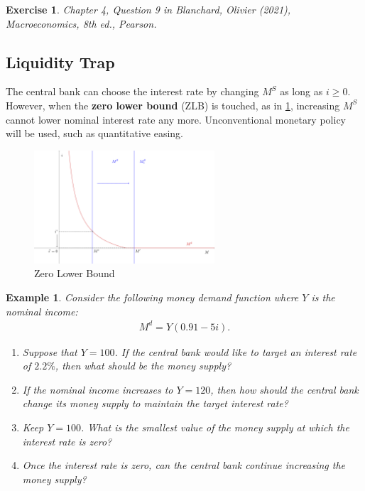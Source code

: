 \documentclass[12pt]{article}
\newtheorem{example}{Example}
\newtheorem{exercise}{Exercise}
\begin{document}
\begin{exercise}
	Chapter 4, Question 9 in Blanchard, Olivier (2021), \textit{Macroeconomics}, 8th ed., Pearson.
\end{exercise}

\subsection*{Liquidity Trap}
The central bank can choose the interest rate by changing $M^S$ as long as $i\geq 0$. However, when the \textbf{zero lower bound} (ZLB) is touched, as in \ref{fig:zlb}, increasing $M^S$ cannot lower nominal interest rate any more. Unconventional monetary policy will be used, such as quantitative easing.

\begin{figure}[htp]
    \centering
    \includegraphics[width=0.6\textwidth]{zlb.png}
    \caption{Zero Lower Bound}
    \label{fig:zlb}
\end{figure}

\begin{example}
	Consider the following money demand function where $Y$ is the nominal income:
	\begin{align*}
		M^d = Y (0.91-5i).
	\end{align*}
	
	\begin{enumerate}[label=(\alph*)]
		\item Suppose that $Y=100$. If the central bank would like to target an interest rate of $2.2\%$, then what should be the money supply?
		\vspace{36pt}
		\item If the nominal income increases to $Y=120$, then how should the central bank change its money supply to maintain the target interest rate?
		\vspace{36pt}
		\item Keep $Y=100$. What is the smallest value of the money supply at which the interest rate is zero?
		\vspace{36pt}
		\item Once the interest rate is zero, can the central bank continue increasing the money supply?
	\end{enumerate}
\end{example}
\end{document}
